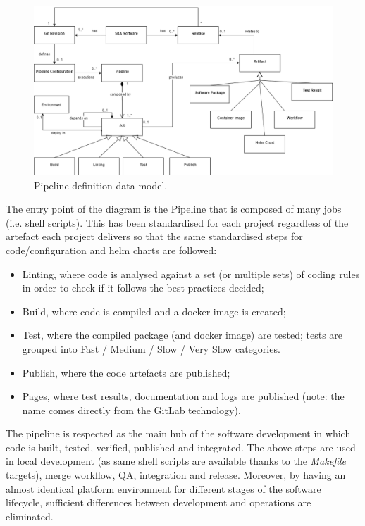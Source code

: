 \documentclass[a4paper,
               keeplastbox,   %
               ]{jacow}
\begin{document}
\begin{figure}[!htb]
   \centering
   \includegraphics*[width=0.8\columnwidth]{dataEntity}
   \caption{Pipeline definition data model.}
   \label{fig:pipelinedatamodel}
\end{figure}

The entry point of the diagram is the Pipeline that is composed of many jobs (i.e. shell scripts).  This has been standardised for each project regardless of the artefact each project delivers so that the same standardised steps for code/configuration and helm charts are followed:
\begin{itemize}
    \item Linting, where code is analysed against a set (or multiple sets) of coding rules in order to check if it follows the best practices decided;
    \item Build, where code is compiled and a docker image is created;
    \item Test, where the compiled package (and docker image) are tested; tests are grouped into Fast / Medium / Slow / Very Slow categories.
    \item Publish, where the code artefacts are published;
    \item Pages, where test results, documentation and logs are published (note: the name comes directly from the GitLab technology).
\end{itemize}

The pipeline is respected as the main hub of the software development in which code is built, tested, verified, published and integrated. The above steps are used in local development (as same shell scripts are available thanks to the \textit{Makefile} targets), merge workflow, QA, integration and release. Moreover, by having an almost identical platform environment for different stages of the software lifecycle, sufficient differences between development and operations are eliminated.
\end{document}
